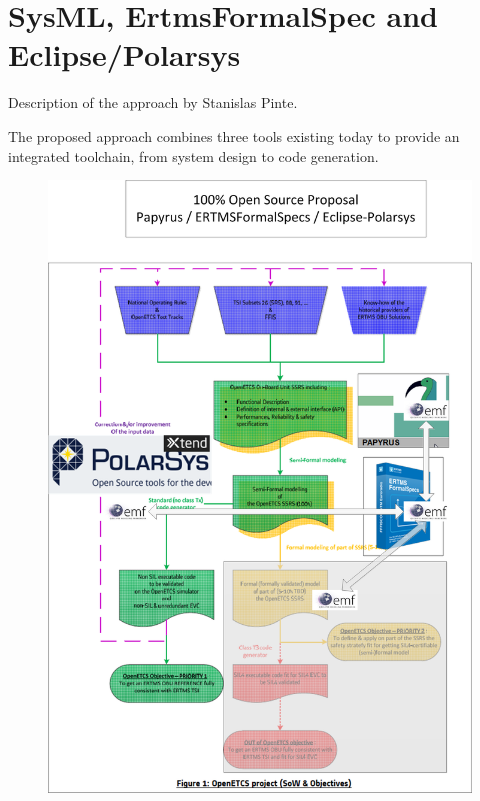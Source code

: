 \chapter{SysML, ErtmsFormalSpec and Eclipse/Polarsys}
\label{sec:sysML-EFS}

\begin{todo_comment}
Description of the approach by Stanislas Pinte.
\end{todo_comment}

The proposed approach combines three tools existing today to provide an integrated toolchain, from system design 
to code generation.

\begin{figure}
	\centering
		\includegraphics[width=\linewidth]{images/ERTMSSolutionsAlt_1.png}
	\label{fig:ERTMSSolutionsAlt_1}
\end{figure}

